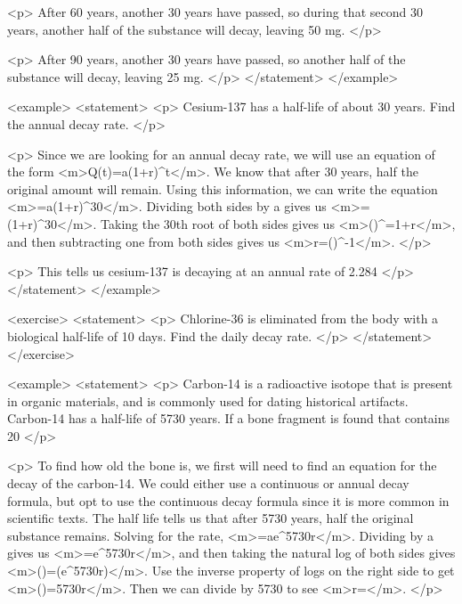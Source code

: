                 <p>
                    After 60 years, another 30 years have passed, so during that second 30 years, another half of the substance will decay, leaving 50 mg.
                </p>

                <p>
                    After 90 years, another 30 years have passed, so another half of the substance will decay, leaving 25 mg.
                </p>
            </statement>
        </example>

        <example>
            <statement>
                <p>
                    Cesium-137 has a half-life of about 30 years.
                    Find the annual decay rate.
                </p>

                <p>
                    Since we are looking for an annual decay rate, we will use an equation of the form <m>Q(t)=a(1+r)^{t}</m>.
                    We know that after 30 years, half the original amount will remain.
                    Using this information, we can write the equation <m>=a(1+r)^{30}</m>.
                    Dividing both sides by a gives us <m>=(1+r)^{30}</m>.
                    Taking the 30th root of both sides gives us <m>()^{}=1+r</m>, and then subtracting one from both sides gives us <m>r=()^{}-1</m>.
                </p>

                <p>
                    This tells us cesium-137 is decaying at an annual rate of 2.284%
                </p>
            </statement>
        </example>

        <exercise>
            <statement>
                <p>
                    Chlorine-36 is eliminated from the body with a biological half-life of 10 days.
                    Find the daily decay rate.
                </p>
            </statement>
        </exercise>

        <example>
            <statement>
                <p>
                    Carbon-14 is a radioactive isotope that is present in organic materials, and is commonly used for dating historical artifacts.
                    Carbon-14 has a half-life of 5730 years.
                    If a bone fragment is found that contains 20%
                </p>

                <p>
                    To find how old the bone is, we first will need to find an equation for the decay of the carbon-14.
                    We could either use a continuous or annual decay formula, but opt to use the continuous decay formula since it is more common in scientific texts.
                    The half life tells us that after 5730 years, half the original substance remains.
                    Solving for the rate, <m>=ae^{5730r}</m>.
                    Dividing by a gives us <m>=e^{5730r}</m>, and then taking the natural log of both sides gives <m>\ln()=\ln(e^{5730r})</m>.
                    Use the inverse property of logs on the right side to get <m>\ln()=5730r</m>.
                    Then we can divide by 5730 to see <m>r=</m>.
                </p>

